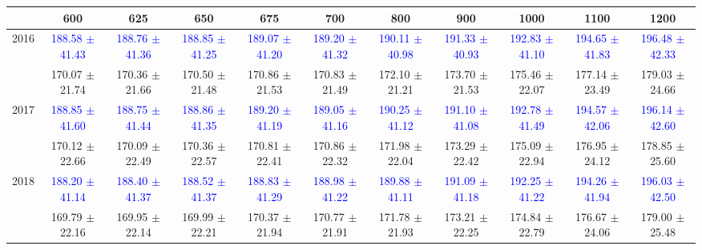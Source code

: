 {
\renewcommand{\arraystretch}{1.0}
\begin{center}
\begin{small}
\begin{tabular}{ccccccccccc}
\hline\hline
 & 600 & 625 & 650 & 675 & 700 & 800 & 900 & 1000 & 1100 & 1200 \\
\hline
\multirow{2}{*}{2016} & \textcolor{blue}{188.58 $\pm$ 41.43} & \textcolor{blue}{188.76 $\pm$ 41.36} & \textcolor{blue}{188.85 $\pm$ 41.25} & \textcolor{blue}{189.07 $\pm$ 41.20} & \textcolor{blue}{189.20 $\pm$ 41.32} & \textcolor{blue}{190.11 $\pm$ 40.98} & \textcolor{blue}{191.33 $\pm$ 40.93} & \textcolor{blue}{192.83 $\pm$ 41.10} & \textcolor{blue}{194.65 $\pm$ 41.83} & \textcolor{blue}{196.48 $\pm$ 42.33} \\
 & \textcolor{myred}{170.07 $\pm$ 21.74} & \textcolor{myred}{170.36 $\pm$ 21.66} & \textcolor{myred}{170.50 $\pm$ 21.48} & \textcolor{myred}{170.86 $\pm$ 21.53} & \textcolor{myred}{170.83 $\pm$ 21.49} & \textcolor{myred}{172.10 $\pm$ 21.21} & \textcolor{myred}{173.70 $\pm$ 21.53} & \textcolor{myred}{175.46 $\pm$ 22.07} & \textcolor{myred}{177.14 $\pm$ 23.49} & \textcolor{myred}{179.03 $\pm$ 24.66} \\
\hline
\multirow{2}{*}{2017} & \textcolor{blue}{188.85 $\pm$ 41.60} & \textcolor{blue}{188.75 $\pm$ 41.44} & \textcolor{blue}{188.86 $\pm$ 41.35} & \textcolor{blue}{189.20 $\pm$ 41.19} & \textcolor{blue}{189.05 $\pm$ 41.16} & \textcolor{blue}{190.25 $\pm$ 41.12} & \textcolor{blue}{191.10 $\pm$ 41.08} & \textcolor{blue}{192.78 $\pm$ 41.49} & \textcolor{blue}{194.57 $\pm$ 42.06} & \textcolor{blue}{196.14 $\pm$ 42.60} \\
 & \textcolor{myred}{170.12 $\pm$ 22.66} & \textcolor{myred}{170.09 $\pm$ 22.49} & \textcolor{myred}{170.36 $\pm$ 22.57} & \textcolor{myred}{170.81 $\pm$ 22.41} & \textcolor{myred}{170.86 $\pm$ 22.32} & \textcolor{myred}{171.98 $\pm$ 22.04} & \textcolor{myred}{173.29 $\pm$ 22.42} & \textcolor{myred}{175.09 $\pm$ 22.94} & \textcolor{myred}{176.95 $\pm$ 24.12} & \textcolor{myred}{178.85 $\pm$ 25.60} \\
\hline
\multirow{2}{*}{2018} & \textcolor{blue}{188.20 $\pm$ 41.14} & \textcolor{blue}{188.40 $\pm$ 41.37} & \textcolor{blue}{188.52 $\pm$ 41.37} & \textcolor{blue}{188.83 $\pm$ 41.29} & \textcolor{blue}{188.98 $\pm$ 41.22} & \textcolor{blue}{189.88 $\pm$ 41.11} & \textcolor{blue}{191.09 $\pm$ 41.18} & \textcolor{blue}{192.25 $\pm$ 41.22} & \textcolor{blue}{194.26 $\pm$ 41.94} & \textcolor{blue}{196.03 $\pm$ 42.50} \\
 & \textcolor{myred}{169.79 $\pm$ 22.16} & \textcolor{myred}{169.95 $\pm$ 22.14} & \textcolor{myred}{169.99 $\pm$ 22.21} & \textcolor{myred}{170.37 $\pm$ 21.94} & \textcolor{myred}{170.77 $\pm$ 21.91} & \textcolor{myred}{171.78 $\pm$ 21.93} & \textcolor{myred}{173.21 $\pm$ 22.25} & \textcolor{myred}{174.84 $\pm$ 22.79} & \textcolor{myred}{176.67 $\pm$ 24.06} & \textcolor{myred}{179.00 $\pm$ 25.48} \\
\hline\hline
\end{tabular}
\end{small}
\end{center}
}

